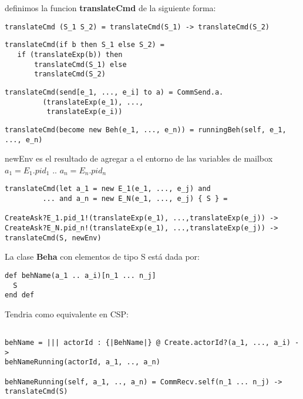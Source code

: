 definimos la funcion \textbf{translateCmd} de la siguiente forma:

\begin{verbatim}
translateCmd (S_1 S_2) = translateCmd(S_1) -> translateCmd(S_2)
\end{verbatim}


\begin{verbatim}
translateCmd(if b then S_1 else S_2) = 
   if (translateExp(b)) then
       translateCmd(S_1) else 
       translateCmd(S_2)
\end{verbatim}

\begin{verbatim}
translateCmd(send[e_1, ..., e_i] to a) = CommSend.a.
         (translateExp(e_1), ..., 
          translateExp(e_i)) 
\end{verbatim}

\begin{verbatim}
translateCmd(become new Beh(e_1, ..., e_n)) = runningBeh(self, e_1, ..., e_n)
\end{verbatim}

newEnv es el resultado de agregar a el entorno de las variables de mailbox $a_1
= E_1.pid_1$ .. $a_n = E_n.pid_n$
\begin{verbatim}
translateCmd(let a_1 = new E_1(e_1, ..., e_j) and 
         ... and a_n = new E_N(e_1, ..., e_j) { S } = 

CreateAsk?E_1.pid_1!(translateExp(e_1), ...,translateExp(e_j)) ->
CreateAsk?E_N.pid_n!(translateExp(e_1), ...,translateExp(e_j)) ->
translateCmd(S, newEnv)
\end{verbatim}


La clase \textbf{Beha} con elementos de tipo S está dada por:

\begin{verbatim}
def behName(a_1 .. a_i)[n_1 ... n_j]
  S
end def
\end{verbatim}

Tendria como equivalente en CSP:

\begin{verbatim}

behName = ||| actorId : {|BehName|} @ Create.actorId?(a_1, ..., a_i) ->
behNameRunning(actorId, a_1, .., a_n)

behNameRunning(self, a_1, .., a_n) = CommRecv.self(n_1 ... n_j) -> translateCmd(S)

\end{verbatim}
